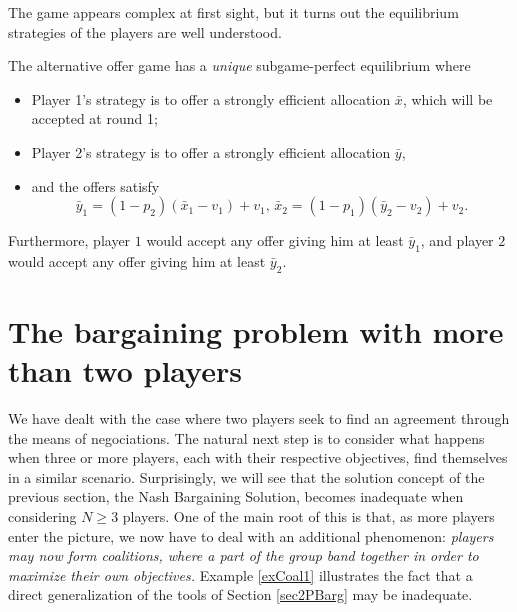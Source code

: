 The game appears complex at first sight, but it turns out the equilibrium strategies of the players are well understood.

\begin{theorem}
The alternative offer game has a \emph{unique} subgame-perfect equilibrium where
\begin{itemize}
\item Player 1's strategy is to offer a strongly efficient allocation $\bar{x}$, which will be accepted at round 1;
\item Player 2's strategy is to offer a strongly efficient allocation $\bar{y}$,
\item and the offers satisfy $$\bar{y}_1 = (1-p_2)(\bar{x}_1 - v_1) + v_1, \, \bar{x}_2 = (1-p_1)(\bar{y}_2 - v_2) + v_2. $$
\end{itemize}
Furthermore, player $1$ would accept any offer giving him at least $\bar{y}_1$, and player $2$ would accept any offer giving him at least $\bar{y}_2$.
\end{theorem}




\section{The bargaining problem with more than two players}


We have dealt with the case where two players seek to find an agreement through the means of negociations. The natural next step is to consider what happens when three or more players, each with their respective objectives, find themselves in a similar scenario. Surprisingly, we will see that the solution concept of the previous section, the Nash Bargaining Solution, becomes inadequate when considering $N \geq 3$ players. One of the main root of this is that, as more players enter the picture, we now have to deal with an additional phenomenon: \emph{players may now form coalitions, where a part of the group band together in order to maximize their own objectives.}
Example \ref{exCoal1} illustrates the fact that a direct generalization of the tools of Section \ref{sec2PBarg} may be inadequate.

